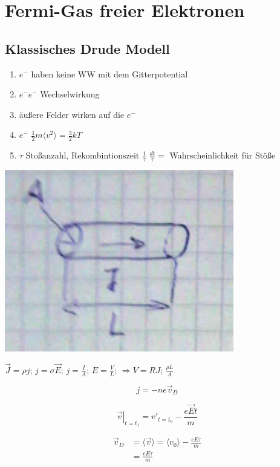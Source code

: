 \chapter{Fermi-Gas freier Elektronen}

\section{Klassisches Drude Modell}

\begin{enumerate}
\item \(e^{-}\) haben keine WW mit dem Gitterpotential
\item \(e^{-}e^{-}\) Wechselwirkung
\item äußere Felder wirken auf die \(e^{-}\)
\item  \(e^{-}\) \(\frac{1}{2}m\langle v^2\rangle =\frac{3}{2}kT\)
\item \(\tau\) Stoßanzahl, Rekombintionszeit \(\frac{1}{\tau}\) \(\frac{dt}{\tau}=\) Wahrscheinlichkeit für Stöße
\end{enumerate}

\includegraphics[width=0.75\textwidth]{kap06_17.png}

\(\vec J=\rho j\); \(j=\sigma\vec E\); \(j=\frac{I}{A}\); \(E=\frac{V}{L}\); \(\Rightarrow V=RJ\); \( \frac{\rho L}{A}\)

\[ j = -ne\vec v_D\]

\[\left. \vec v\right|_{t=t_1}=v'_{t=t_0}-\frac{e\vec E t}{m} \]

\begin{align}
\vec v_D &= \langle \vec v \rangle  = \langle v_0\rangle -\frac{eE\tau}{m} \\
&=\frac{eE\tau}{m}
\end{align}


